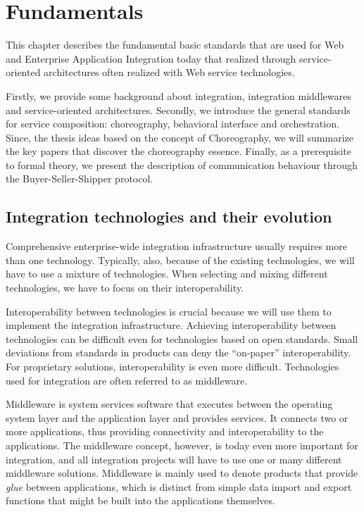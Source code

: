 \chapter{Fundamentals}
\label{chap:fundamentals}

This chapter describes the fundamental basic standards that are used for Web and Enterprise Application Integration today that realized through service-oriented architectures often realized with Web service technologies.

Firstly, we provide some background about integration, integration middlewares and service-oriented architectures. Secondly, we introduce the general standards for service composition: choreography, behavioral interface and orchestration. Since, the thesis ideas based on the concept of Choreography, we will summarize the key papers that discover the choreography essence. Finally, as a prerequisite to formal theory, we present the description of communication behaviour through the Buyer-Seller-Shipper protocol.

\section{Integration technologies and their evolution}

Comprehensive enterprise-wide integration infrastructure usually requires more than one technology. Typically, also, because of the existing technologies, we will have to use a mixture of technologies. When selecting and mixing different technologies, we have to focus on their interoperability.

Interoperability between technologies is crucial because we will use them to implement the integration infrastructure. Achieving interoperability between technologies can be difficult even for technologies based on open standards. Small deviations from standards in products can deny the ``on-paper'' interoperability. For proprietary solutions, interoperability is even more difficult. Technologies used for integration are often referred to as middleware.

Middleware is system services software that executes between the operating system layer and the application layer and provides services. It connects two or more applications, thus providing connectivity and interoperability to the applications. The middleware concept, however, is today even more important for integration, and all integration projects will have to use one or many different middleware solutions. Middleware is mainly used to denote products that provide \textit{glue} between applications, which is distinct from simple data import and export functions that might be built into the applications themselves.

